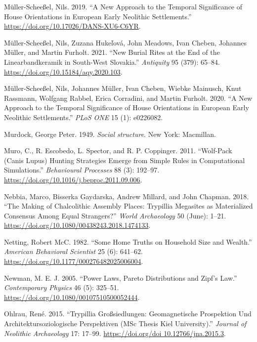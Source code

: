 \documentclass[
  12pt,
  a4paper, twoside]{book}
\newlength{\cslhangindent}
\newlength{\cslentryspacingunit} %
\newenvironment{CSLReferences}[2] %
 {%
  \setlength{\parindent}{0pt}
  \ifodd #1
  \let\oldpar\par
  \def\par{\hangindent=\cslhangindent\oldpar}
  \fi
  \setlength{\parskip}{#2\cslentryspacingunit}
 }%
 {}
\begin{document}
\begin{CSLReferences}{1}{0}
\leavevmode{}%
Müller-Scheeßel, Nils. 2019. {``A New Approach to the Temporal Significance of House Orientations in European Early Neolithic Settlements.''} \url{https://doi.org/10.17026/DANS-XU6-C6YR}.

\leavevmode{}%
Müller-Scheeßel, Nils, Zuzana Hukeľová, John Meadows, Ivan Cheben, Johannes Müller, and Martin Furholt. 2021. {``New Burial Rites at the End of the {Linearbandkeramik} in South-West {Slovakia}.''} \emph{Antiquity} 95 (379): 65--84. \url{https://doi.org/10.15184/aqy.2020.103}.

\leavevmode{}%
Müller-Scheeßel, Nils, Johannes Müller, Ivan Cheben, Wiebke Mainusch, Knut Rassmann, Wolfgang Rabbel, Erica Corradini, and Martin Furholt. 2020. {``A New Approach to the Temporal Significance of House Orientations in European Early Neolithic Settlements.''} \emph{PLoS ONE} 15 (1): e0226082.

\leavevmode{}%
Murdock, George Peter. 1949. \emph{Social structure}. New York: Macmillan.

\leavevmode{}%
Muro, C., R. Escobedo, L. Spector, and R. P. Coppinger. 2011. {``Wolf-Pack (Canis Lupus) Hunting Strategies Emerge from Simple Rules in Computational Simulations.''} \emph{Behavioural Processes} 88 (3): 192--97. \url{https://doi.org/10.1016/j.beproc.2011.09.006}.

\leavevmode{}%
Nebbia, Marco, Bisserka Gaydarska, Andrew Millard, and John Chapman. 2018. {``The Making of Chalcolithic Assembly Places: Trypillia Megasites as Materialized Consensus Among Equal Strangers?''} \emph{World Archaeology} 50 (June): 1--21. \url{https://doi.org/10.1080/00438243.2018.1474133}.

\leavevmode{}%
Netting, Robert McC. 1982. {``Some Home Truths on Household Size and Wealth.''} \emph{American Behavioral Scientist} 25 (6): 641--62. \url{https://doi.org/10.1177/000276482025006004}.

\leavevmode{}%
Newman, M. E. J. 2005. {``Power Laws, Pareto Distributions and Zipf's Law.''} \emph{Contemporary Physics} 46 (5): 325--51. \url{https://doi.org/10.1080/00107510500052444}.

\leavevmode{}%
Ohlrau, René. 2015. {``Trypillia Großsiedlungen: Geomagnetische Prospektion Und Architektursoziologische Perspektiven (MSc Thesis Kiel University).''} \emph{Journal of Neolithic Archaeology} 17: 17--99. \href{https://doi.org/doi\%2010.12766/jna.2015.3}{https://doi.org/doi 10.12766/jna.2015.3}.


\end{CSLReferences}
\end{document}
